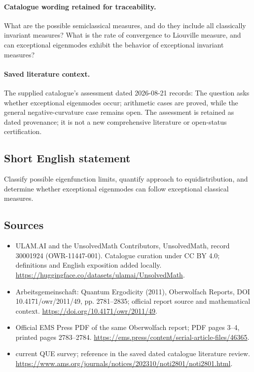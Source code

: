 \documentclass[11pt]{article}
\begin{document}
\paragraph{Catalogue wording retained for traceability.}
What are the possible semiclassical measures, and do they include all classically invariant measures? What is the rate of convergence to Liouville measure, and can exceptional eigenmodes exhibit the behavior of exceptional invariant measures?

\paragraph{Saved literature context.} The supplied catalogue's assessment dated 2026-08-21 records: The question asks whether exceptional eigenmodes occur; arithmetic cases are proved, while the general negative-curvature case remains open. The assessment is retained as dated provenance; it is not a new comprehensive literature or open-status certification.
\subsection{Short English statement}
Classify possible eigenfunction limits, quantify approach to equidistribution, and determine whether exceptional eigenmodes can follow exceptional classical measures.
\subsection{Sources}
\begin{itemize}
\item[\hypertarget{source:30001924:1}{S1}] ULAM.AI and the UnsolvedMath Contributors, UnsolvedMath, record 30001924 (OWR-11447-001). Catalogue curation under CC BY 4.0; definitions and English exposition added locally.
\url{https://huggingface.co/datasets/ulamai/UnsolvedMath}.
\item[\hypertarget{source:30001924:2}{S2}] Arbeitsgemeinschaft: Quantum Ergodicity (2011), Oberwolfach Reports, DOI 10.4171/owr/2011/49, pp. 2781--2835; official report source and mathematical context.
\url{https://doi.org/10.4171/owr/2011/49}.
\item[\hypertarget{source:30001924:3}{S3}] Official EMS Press PDF of the same Oberwolfach report; PDF pages 3--4, printed pages 2783--2784.
\url{https://ems.press/content/serial-article-files/46365}.
\item[\hypertarget{source:30001924:4}{S4}] current QUE survey; reference in the saved dated catalogue literature review.
\url{https://www.ams.org/journals/notices/202310/noti2801/noti2801.html}.
\end{itemize}
\label{end:30001924}
\end{document}

